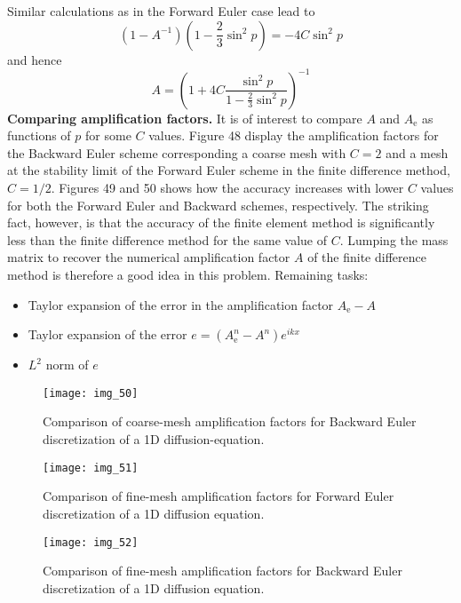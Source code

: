 \documentclass[../main.tex]{subfiles}
\begin{document}
		Similar calculations as in the Forward Euler case lead to
		$$
		\left(1-A^{-1}\right)\left(1-\frac{2}{3} \sin ^{2} p\right)=-4 C \sin ^{2} p
		$$
		and hence
		$$
		A=\left(1+4 C \frac{\sin ^{2} p}{1-\frac{2}{3} \sin ^{2} p}\right)^{-1}
		$$
		\noindent \textbf{Comparing amplification factors. } It is of interest to compare $A$ and $A_{\mathrm{e}}$ as functions of $p$ for some $C$ values. Figure 48 display the amplification factors for the Backward Euler scheme corresponding a coarse mesh with $C=2$ and a mesh at the stability limit of the Forward Euler scheme in the finite difference method, $C=1 / 2$. Figures 49 and 50 shows how the accuracy increases with lower $C$ values for both the Forward Euler and Backward schemes, respectively. The striking fact, however, is that the accuracy of the finite element method is significantly less than the finite difference method for the same value of $C$. Lumping the mass matrix to recover the numerical amplification factor $A$ of the finite difference method is therefore a good idea in this problem. Remaining tasks:
		\begin{itemize}
			\item Taylor expansion of the error in the amplification factor $A_{\mathrm{e}}-A$
			\item Taylor expansion of the error $e=\left(A_{\mathrm{e}}^{n}-A^{n}\right) e^{i k x}$
			\item $L^{2}$ norm of $e$
		\end{itemize}
		
		\begin{figure}
			\centering
			\texttt{[image: img\_50]}
			\caption{Comparison of coarse-mesh amplification factors for Backward Euler discretization of a 1D diffusion-equation.}
			\label{fig:img_48}
		\end{figure}
	
		\begin{figure}
			\centering
			\texttt{[image: img\_51]}
			\caption{Comparison of fine-mesh amplification factors for Forward Euler discretization of a 1D diffusion equation.}
			\label{fig:img_49}
		\end{figure}
	
		\begin{figure}
			\centering
			\texttt{[image: img\_52]}
			\caption{Comparison of fine-mesh amplification factors for Backward Euler discretization of a 1D diffusion equation.}
			\label{fig:img_50}
		\end{figure}

\clearpage
\end{document}
